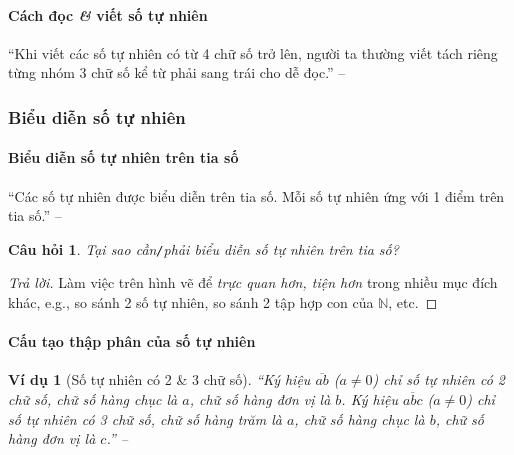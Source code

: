 \documentclass{article}
\numberwithin{equation}{section}
\newtheorem{vidu}{Ví dụ}[section]
\newtheorem{cauhoi}{Câu hỏi}[section]
\begin{document}
\paragraph{Cách đọc \textit{\&} viết số tự nhiên}
``Khi viết các số tự nhiên có từ 4 chữ số trở lên, người ta thường viết tách riêng từng nhóm 3 chữ số kể từ phải sang trái cho dễ đọc.'' -- \cite[p. 9]{SGK_Toan_6_Canh_Dieu_tap_1}

\subsubsection{Biểu diễn số tự nhiên}

\paragraph{Biểu diễn số tự nhiên trên tia số}
``Các số tự nhiên được biểu diễn trên tia số. Mỗi số tự nhiên ứng với 1 điểm trên tia số.'' -- \cite[p. 10]{SGK_Toan_6_Canh_Dieu_tap_1}

\begin{cauhoi}
	Tại sao cần\emph{\texttt{/}}phải biểu diễn số tự nhiên trên tia số?
\end{cauhoi}

\begin{proof}[Trả lời]
	Làm việc trên hình vẽ để \textit{trực quan hơn, tiện hơn} trong nhiều mục đích khác, e.g., so sánh 2 số tự nhiên, so sánh 2 tập hợp con của $\mathbb{N}$, etc.
\end{proof}

\paragraph{Cấu tạo thập phân của số tự nhiên}
\begin{vidu}[Số tự nhiên có 2 \& 3 chữ số]
	``Ký hiệu $\overline{ab}$ ($a\ne 0$) chỉ số tự nhiên có 2 chữ số, chữ số hàng chục là $a$, chữ số hàng đơn vị là $b$. Ký hiệu $\overline{abc}$ ($a\ne 0$) chỉ số tự nhiên có 3 chữ số, chữ số hàng trăm là $a$, chữ số hàng chục là $b$, chữ số hàng đơn vị là $c$.'' -- \cite[p. 10]{SGK_Toan_6_Canh_Dieu_tap_1}
\end{vidu}
\end{document}

